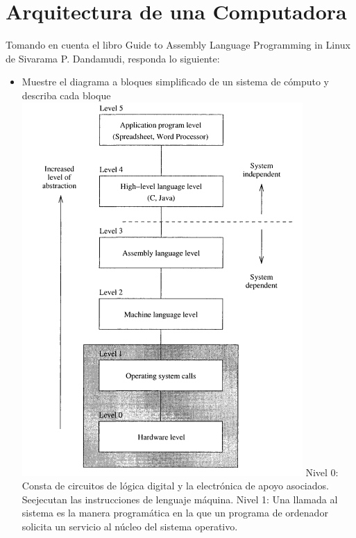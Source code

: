 \section{Arquitectura de una Computadora}

	Tomando en cuenta el libro Guide to Assembly Language Programming in Linux de Sivarama P. Dandamudi, responda lo siguiente:

	\begin{itemize}

		\item Muestre el diagrama a bloques simplificado de un sistema de cómputo y describa cada bloque
		   \includegraphics{imagenes/captura.png}
		   Nivel 0: Consta de circuitos de lógica digital y la electrónica de apoyo asociados. Seejecutan las instrucciones de lenguaje máquina.
		   Nivel 1: Una llamada al sistema es la manera programática en la que un programa de ordenador solicita un servicio al núcleo del sistema operativo.
		   

\end{itemize}
